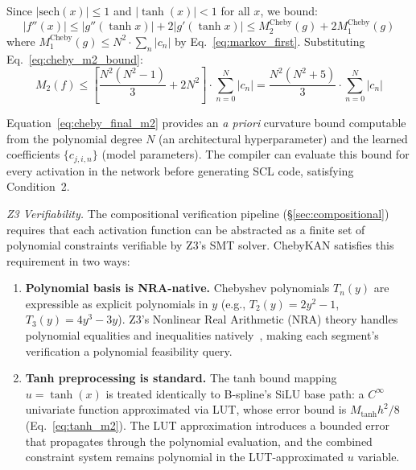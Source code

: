 Since $|\text{sech}(x)| \leq 1$ and $|\tanh(x)| < 1$ for all $x$, we
bound:
\begin{equation}
|f''(x)| \leq |g''(\tanh x)| + 2|g'(\tanh x)| \leq M_2^{\text{Cheby}}(g)
+ 2 M_1^{\text{Cheby}}(g)
\label{eq:cheby_f_m2_total}
\end{equation}
where $M_1^{\text{Cheby}}(g) \leq N^2 \cdot \sum_n |c_n|$ by
Eq.~\ref{eq:markov_first}. Substituting Eq.~\ref{eq:cheby_m2_bound}:
\begin{equation}
M_2(f) \leq \left[\frac{N^2(N^2-1)}{3} + 2N^2\right] \cdot \sum_{n=0}^{N}
|c_n| = \frac{N^2(N^2+5)}{3} \cdot \sum_{n=0}^{N} |c_n|
\label{eq:cheby_final_m2}
\end{equation}

Equation~\ref{eq:cheby_final_m2} provides an \textit{a priori} curvature
bound computable from the polynomial degree $N$ (an architectural
hyperparameter) and the learned coefficients $\{c_{j,i,n}\}$ (model
parameters). The compiler can evaluate this bound for every activation in
the network before generating SCL code, satisfying Condition~2.

\vspace{2pt}
\noindent\textit{Z3 Verifiability.}
The compositional verification pipeline ({\S}\ref{sec:compositional}) requires that each
activation function can be abstracted as a finite set of polynomial
constraints verifiable by Z3's SMT solver. ChebyKAN satisfies this
requirement in two ways:

\begin{enumerate}
    \item \textbf{Polynomial basis is NRA-native.} Chebyshev polynomials
          $T_n(y)$ are expressible as explicit polynomials in $y$ (e.g.,
          $T_2(y) = 2y^2 - 1$, $T_3(y) = 4y^3 - 3y$). Z3's Nonlinear
          Real Arithmetic (NRA) theory handles polynomial equalities and
          inequalities natively~\cite{de2008z3}, making each segment's
          verification a polynomial feasibility query.

    \item \textbf{Tanh preprocessing is standard.} The tanh bound mapping
          $u = \tanh(x)$ is treated identically to B-spline's SiLU base
          path: a $C^\infty$ univariate function approximated via LUT,
          whose error bound is $M_{\tanh} h^2/8$ (Eq.~\ref{eq:tanh_m2}).
          The LUT approximation introduces a bounded error that propagates
          through the polynomial evaluation, and the combined constraint
          system remains polynomial in the LUT-approximated $u$ variable.
\end{enumerate}

